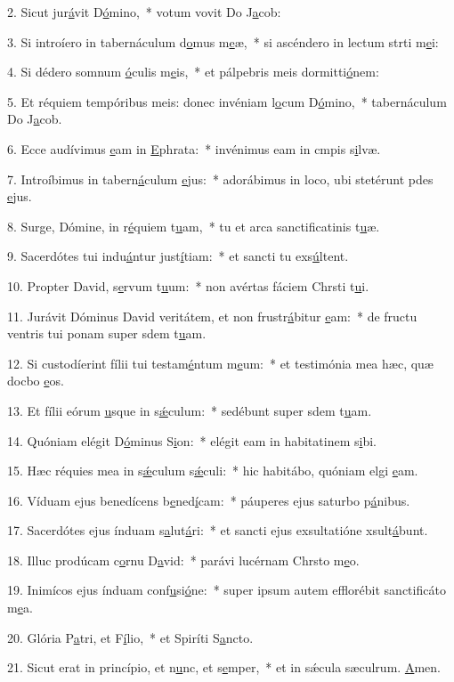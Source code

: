 2. Sicut jur\uline{á}vit D\uline{ó}mino,~* votum vovit Do J\uline{a}cob:\par 
3. Si introíero in tabernáculum d\uline{o}mus m\uline{e}æ,~* si ascéndero in lectum strti m\uline{e}i:\par 
4. Si dédero somnum \uline{ó}culis m\uline{e}is,~* et pálpebris meis dormitti\uline{ó}nem:\par 
5. Et réquiem tempóribus meis: donec invéniam l\uline{o}cum D\uline{ó}mino,~* tabernáculum Do J\uline{a}cob.\par 
6. Ecce audívimus \uline{e}am in \uline{E}phrata:~* invénimus eam in cmpis s\uline{i}lvæ.\par 
7. Introíbimus in tabern\uline{á}culum \uline{e}jus:~* adorábimus in loco, ubi stetérunt pdes \uline{e}jus.\par 
8. Surge, Dómine, in r\uline{é}quiem t\uline{u}am,~* tu et arca sanctificatinis t\uline{u}æ.\par 
9. Sacerdótes tui indu\uline{á}ntur just\uline{í}tiam:~* et sancti tu exs\uline{ú}ltent.\par 
10. Propter David, s\uline{e}rvum t\uline{u}um:~* non avértas fáciem Chrsti t\uline{u}i.\par 
11. Jurávit Dóminus David veritátem, et non frustr\uline{á}bitur \uline{e}am:~* de fructu ventris tui ponam super sdem t\uline{u}am.\par 
12. Si custodíerint fílii tui testam\uline{é}ntum m\uline{e}um:~* et testimónia mea hæc, quæ docbo \uline{e}os.\par 
13. Et fílii eórum \uline{u}sque in s\uline{ǽ}culum:~* sedébunt super sdem t\uline{u}am.\par 
14. Quóniam elégit D\uline{ó}minus S\uline{i}on:~* elégit eam in habitatinem s\uline{i}bi.\par 
15. Hæc réquies mea in s\uline{ǽ}culum s\uline{ǽ}culi:~* hic habitábo, quóniam elgi \uline{e}am.\par 
16. Víduam ejus benedícens b\uline{e}ned\uline{í}cam:~* páuperes ejus saturbo p\uline{á}nibus.\par 
17. Sacerdótes ejus índuam s\uline{a}lut\uline{á}ri:~* et sancti ejus exsultatióne xsult\uline{á}bunt.\par 
18. Illuc prodúcam c\uline{o}rnu D\uline{a}vid:~* parávi lucérnam Chrsto m\uline{e}o.\par 
19. Inimícos ejus índuam conf\uline{u}si\uline{ó}ne:~* super ipsum autem efflorébit sanctificáto m\uline{e}a.\par 
20. Glória P\uline{a}tri, et F\uline{í}lio,~* et Spiríti S\uline{a}ncto.\par 
21. Sicut erat in princípio, et n\uline{u}nc, et s\uline{e}mper,~* et in sǽcula sæculrum. \uline{A}men.\par 
